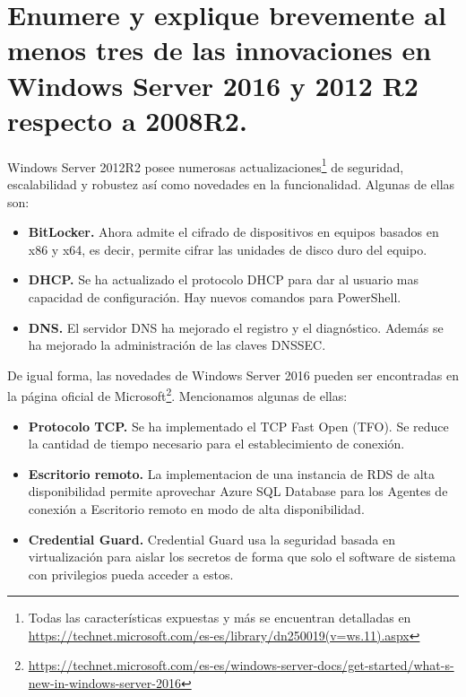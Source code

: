 
\section{Enumere y explique brevemente al menos tres de las innovaciones en Windows Server 2016 y 2012 R2 
respecto a 2008R2.}

Windows Server 2012R2 posee numerosas 
actualizaciones\footnote{Todas las características expuestas y más se encuentran detalladas en \url{https://technet.microsoft.com/es-es/library/dn250019(v=ws.11).aspx}} 
de seguridad, escalabilidad y robustez así como novedades en la funcionalidad. Algunas de ellas son:

	\begin{itemize}
		\item \textbf{BitLocker.} Ahora admite el cifrado de dispositivos en equipos basados en x86 y x64, es decir, permite cifrar las unidades de disco duro del equipo.
		\item \textbf{DHCP.} Se ha actualizado el protocolo DHCP para dar al usuario mas capacidad de configuración. Hay nuevos comandos para PowerShell.
		\item \textbf{DNS.} El servidor DNS  ha mejorado el registro y el diagnóstico.  Además se ha mejorado la administración de las claves DNSSEC.
	\end{itemize}

De igual forma, las novedades de Windows Server 2016 pueden ser encontradas en la página oficial de 
Microsoft\footnote{\url{https://technet.microsoft.com/es-es/windows-server-docs/get-started/what-s-new-in-windows-server-2016}}.
Mencionamos algunas de ellas:

	\begin{itemize}
		\item \textbf{Protocolo TCP.} Se ha implementado el TCP Fast Open (TFO). Se reduce la cantidad de tiempo necesario para el establecimiento de conexión.
		\item \textbf{Escritorio remoto.} La implementacion de una instancia de RDS de alta disponibilidad permite aprovechar
		Azure SQL Database para los Agentes de conexión a Escritorio remoto en modo de alta disponibilidad.
		\item \textbf{Credential Guard.} Credential Guard usa la seguridad basada en virtualización para aislar los secretos de 
		forma que solo el software de sistema con privilegios pueda acceder a estos.
	\end{itemize}

